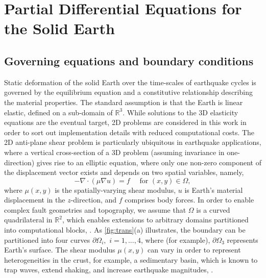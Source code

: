 \section{Partial Differential Equations for the Solid Earth}
\subsection{Governing equations and boundary conditions}
Static deformation of the solid Earth over the time-scales of earthquake cycles is governed by the equilibrium equation and a constitutive relationship describing the material properties.  The standard assumption is that the Earth is linear elastic, defined on a sub-domain of $\mathbb{R}^3$.  While solutions to the 3D elasticity equations are the eventual target, 2D problems are considered in this work in order to sort out implementation details with reduced computational costs.  The 2D anti-plane shear problem \citep{antiplaneshear} is particularly ubiquitous in earthquake applications, where a vertical cross-section of a 3D problem (assuming invariance in one-direction) gives rise to an elliptic equation, where only one non-zero component of the displacement vector exists and depends on two spatial variables, namely,
\begin{equation}
    -\nabla \cdot \left({\mu} \nabla u\right) = f \quad \text{ for } (x, y) \in \Omega, 
    \label{eqn: 2D}
\end{equation}
where ${\mu}(x, y)$ is the spatially-varying shear modulus, $u$ is Earth's material displacement in the $z$-direction, and $f$ comprises body forces. In order to enable complex fault geometries and topography, we assume that $\Omega$ is a curved quadrilateral in $\mathbb{R}^2$, which enables extensions to arbitrary domains partitioned into computational blocks, \citep[e.g.][]{Kozdon2020HybridizedSF}. As \autoref{fig:trans}(a) illustrates, the boundary can be partitioned into four curves $\partial\Omega_i, \,\, i = 1, ..., 4$, where (for example), $\partial \Omega_3$ represents Earth's surface. The shear modulus $\mu(x, y)$ can vary in order to represent heterogeneities in the crust, for example, a sedimentary basin, which is known to trap waves, extend shaking, and increase earthquake magnitudes, \citep[e.g.][]{Boue2016}. 

